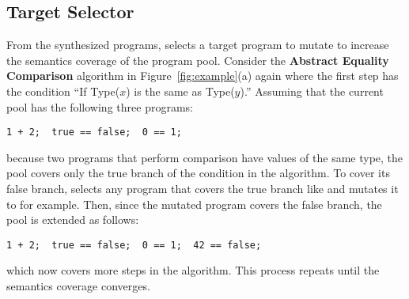 \subsection{Target Selector}
From the synthesized programs,  selects a
target program to mutate to increase the semantics coverage of the
program pool.  Consider the \textbf{Abstract Equality Comparison} algorithm 
in Figure~\ref{fig:example}(a) again where the first step has the condition
``If Type($x$) is the same as Type($y$).'' Assuming that the current pool
has the following three programs:
\begin{lstlisting}[style=myJSstyle]
           1 + 2;  true == false;  0 == 1;
\end{lstlisting}
because two programs that perform comparison have values of the same type,
the pool covers only the true branch of the condition in the algorithm.
To cover its false branch,  selects any program
that covers the true branch like  and 
mutates it to  for example.  Then, since the mutated
program covers the false branch, the pool is extended as follows:
\begin{lstlisting}[style=myJSstyle]
   1 + 2;  true == false;  0 == 1;  42 == false;
\end{lstlisting}
which now covers more steps in the algorithm.
This process repeats until the semantics coverage converges.
